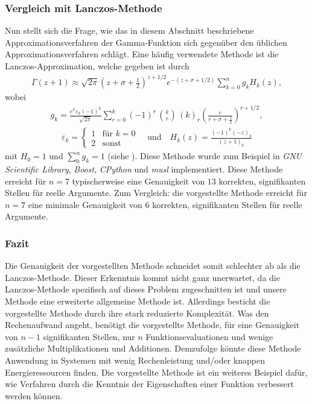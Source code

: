 \subsubsection{Vergleich mit Lanczos-Methode}
%
Nun stellt sich die Frage,
wie das in diesem Abschnitt beschriebene Approximationsverfahren
der Gamma-Funktion sich gegenüber den üblichen Approximationsverfahren schlägt.
Eine häufig verwendete Methode ist die Lanczos-Approximation,
welche gegeben ist durch
\begin{align}
\Gamma(z + 1)
\approx
\sqrt{2\pi} \left( z + \sigma + \frac{1}{2} \right)^{z + 1/2}
e^{-(z + \sigma + 1/2)} \sum_{k=0}^n g_k H_k(z)
,
\end{align}
wobei
\begin{align*}
g_k = \frac{e^\sigma \varepsilon_k (-1)^k}{\sqrt{2\pi}}
\sum_{r=0}^k (-1)^r \, \binom{k}{r} \, (k)_r
\left( \frac{e}{r + \sigma + \frac{1}{2}}\right)^{r + 1/2}
,
\end{align*}
\begin{align*}
\varepsilon_k
=
\begin{cases}
1 & \text{für } k = 0 \\
2 & \text{sonst}
\end{cases}
\quad \text{und}\quad
H_k(z)
=
\frac{(-1)^k (-z)_k}{(z+1)_k}
\end{align*}
mit $H_0 = 1$ und $\sum_0^n g_k = 1$ (siehe \cite{laguerre:lanczos}).
Diese Methode wurde zum Beispiel in
{\em GNU Scientific Library},
%
{\em Boost},
%
{\em CPython} und
%
{\em musl} implementiert.
Diese Methode erreicht für $n = 7$ typischerweise eine Genauigkeit von $13$
korrekten, signifikanten Stellen für reelle Argumente.
Zum Vergleich: die vorgestellte Methode erreicht für $n = 7$
eine minimale Genauigkeit von $6$ korrekten, signifikanten Stellen
%
für reelle Argumente.

\subsubsection{Fazit}
Die Genauigkeit der vorgestellten Methode schneidet somit schlechter ab
als die Lanczos-Methode.
Dieser Erkenntnis kommt nicht ganz unerwartet,
da die Lanczos-Methode spezifisch auf dieses Problem zugeschnitten ist und
unsere Methode eine erweiterte allgemeine Methode ist.
Allerdings besticht die vorgestellte Methode
durch ihre stark reduzierte Komplexität. %
Was den Rechenaufwand angeht,
benötigt die vorgestellte Methode,
für eine Genauigkeit von $n-1$ signifikanten Stellen,
nur $n$ Funktionsevaluationen
und wenige zusätzliche Multiplikationen und Additionen.
Demzufolge könnte diese Methode Anwendung in Systemen mit wenig Rechenleistung
und/oder knappen Energieressourcen finden.
Die vorgestellte Methode ist ein weiteres Beispiel dafür,
wie Verfahren durch die Kenntnis der Eigenschaften einer Funktion
verbessert werden können.
